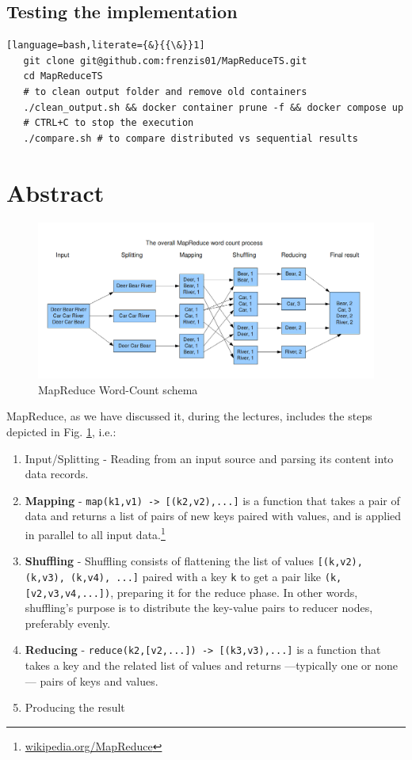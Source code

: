 \subsection*{Testing the implementation}
{\ns
\begin{lstlisting}[language=bash,literate={&}{{\&}}1]
   git clone git@github.com:frenzis01/MapReduceTS.git
   cd MapReduceTS
   # to clean output folder and remove old containers
   ./clean_output.sh && docker container prune -f && docker compose up
   # CTRL+C to stop the execution
   ./compare.sh # to compare distributed vs sequential results
\end{lstlisting}
}
\newpage

\section{Abstract}
\begin{figure}[htbp]
   \centering
   \includegraphics[width=\columnwidth]{images/mapreduce.png}
   \caption{MapReduce Word-Count schema}
   \label{fig:mapreduce}
\end{figure}

{MapReduce, as we have discussed it, during the lectures, includes the steps depicted in Fig. \ref{fig:mapreduce}, i.e.:\ns
\begin{enumerate} 
   \item Input/Splitting - Reading from an input source and parsing its content into data records.
   \item \textbf{Mapping} - \verb|map(k1,v1) -> [(k2,v2),...]| is a function that takes a pair of data and returns a list of pairs of new keys paired with values, and is applied in parallel to all input data.\footnote{\href{https://en.wikipedia.org/wiki/MapReduce}{wikipedia.org/MapReduce}}
   \item \textbf{Shuffling} - Shuffling consists of flattening the list of values \verb|[(k,v2), (k,v3), (k,v4), ...]| paired with a key \texttt{k} to get a pair like \verb|(k,[v2,v3,v4,...])|, preparing it for the reduce phase. In other words, shuffling's purpose is to distribute the key-value pairs to reducer nodes, preferably evenly. 
   \item \textbf{Reducing} - \verb|reduce(k2,[v2,...]) -> [(k3,v3),...]| is a function that takes a key and the related list of values and returns ---typically one or none--- pairs of keys and values. 
   \item Producing the result
\end{enumerate}}

